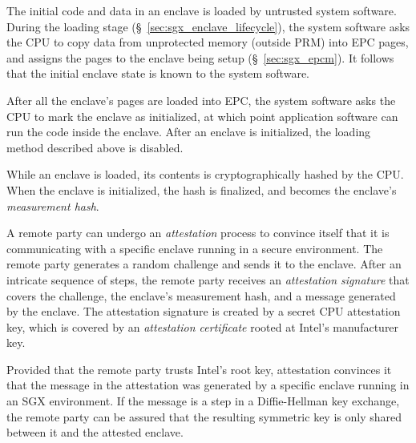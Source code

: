 The initial code and data in an enclave is loaded by untrusted system software.
During the loading stage (\S~\ref{sec:sgx_enclave_lifecycle}), the system
software asks the CPU to copy data from unprotected memory (outside PRM) into
EPC pages, and assigns the pages to the enclave being setup
(\S~\ref{sec:sgx_epcm}). It follows that the initial enclave state is known to
the system software.

After all the enclave's pages are loaded into EPC, the system software asks the
CPU to mark the enclave as initialized, at which point application software can
run the code inside the enclave. After an enclave is initialized, the loading
method described above is disabled.

While an enclave is loaded, its contents is cryptographically hashed by the
CPU. When the enclave is initialized, the hash is finalized, and becomes the
enclave's \textit{measurement hash}.

A remote party can undergo an \textit{attestation} process to convince itself
that it is communicating with a specific enclave running in a secure
environment. The remote party generates a random challenge and sends it to the
enclave. After an intricate sequence of steps, the remote party receives an
\textit{attestation signature} that covers the challenge, the enclave's
measurement hash, and a message generated by the enclave. The attestation
signature is created by a secret CPU attestation key, which is covered by an
\textit{attestation certificate} rooted at Intel's manufacturer key.

Provided that the remote party trusts Intel's root key, attestation convinces
it that the message in the attestation was generated by a specific enclave
running in an SGX environment. If the message is a step in a Diffie-Hellman key
exchange, the remote party can be assured that the resulting symmetric key is
only shared between it and the attested enclave.
